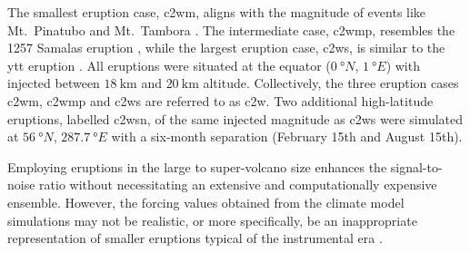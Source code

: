 \documentclass{ametsocV6.1}
\newcommand{\iso}[1][i]{{#1}njected \ce{SO2}}
\begin{document}
The smallest eruption case, \gls{c2wm}, aligns with the magnitude of events like Mt.\
Pinatubo \citep[\(\sim10\)--\(\SI{20}{\tera\gram(\ce{SO2})}\);~e.g.][]{timmreck2018} and
Mt.\ Tambora \citep[\(\sim\SI{56.2}{\tera\gram(\ce{SO2})}\);~e.g.][]{zanchettin2016}.
The intermediate case, \gls{c2wmp}, resembles the 1257 Samalas eruption
\citep[\(\sim{118.8}\)--\(\SI{173.1}{\tera\gram(\ce{SO2})}\);~e.g.][]{toohey2017,ottobliesner2016},
while the largest eruption case, \gls{c2ws}, is similar to the \gls{ytt} eruption
\citep[\(100\)--\(\SI{10000}{\tera\gram()}\);~e.g.][]{jones2005}. All eruptions
were situated at the equator (\(\SI{0}{\degree N}\), \(\SI{1}{\degree E}\)) with
\ce{SO2} injected between \(\SI{18}{\kilo\meter}\) and \(\SI{20}{\kilo\meter}\)
altitude. Collectively, the three eruption cases \gls{c2wm}, \gls{c2wmp} and \gls{c2ws}
are referred to as \gls{c2w}. Two additional high-latitude eruptions, labelled
\gls{c2wsn}, of the same \iso{} magnitude as \gls{c2ws} were simulated at
\(\SI{56}{\degree N}\), \(\SI{287.7}{\degree E}\) with a six-month separation (February
15th and August 15th).

Employing eruptions in the large to super-volcano size enhances the signal-to-noise
ratio without necessitating an extensive and computationally expensive ensemble.
However, the forcing values obtained from the climate model simulations may not be
realistic, or more specifically, be an inappropriate representation of smaller eruptions
typical of the instrumental era \citep{gregory2016}.
\end{document}
